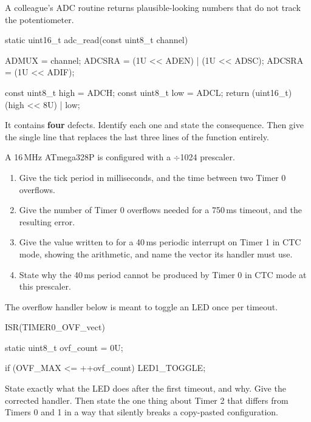 \label{exa:q:4}

 A colleague's ADC routine returns plausible-looking numbers that do not track the
potentiometer.

\begin{ccode}
static uint16_t adc_read(const uint8_t channel)
{
    ADMUX  = channel;
    ADCSRA = (1U << ADEN) | (1U << ADSC);
    ADCSRA = (1U << ADIF);

    const uint8_t high = ADCH;
    const uint8_t low  = ADCL;
    return (uint16_t)(high << 8U) | low;
}
\end{ccode}

\noindent It contains \textbf{four} defects. Identify each one and state the consequence. Then give
the single line that replaces the last three lines of the function entirely. 

 A 16\,MHz ATmega328P is configured with a $\div$1024 prescaler.
\begin{enumerate}
  \item Give the tick period in milliseconds, and the time between two Timer 0 overflows.
  \item Give the number of Timer 0 overflows needed for a 750\,ms timeout, and the resulting error.
  \item Give the value written to  for a 40\,ms periodic interrupt on Timer 1 in CTC
    mode, showing the arithmetic, and name the vector its handler must use.
  \item State why the 40\,ms period cannot be produced by Timer 0 in CTC mode at this prescaler.
\end{enumerate}

 The overflow handler below is meant to toggle an LED once per timeout.

\begin{ccode}
ISR(TIMER0_OVF_vect)
{
    static uint8_t ovf_count = 0U;

    if (OVF_MAX <= ++ovf_count) { LED1_TOGGLE; }
}
\end{ccode}

\noindent State exactly what the LED does after the first timeout, and why. Give the corrected
handler. Then state the one thing about Timer 2 that differs from Timers 0 and 1 in a way that
silently breaks a copy-pasted configuration. 

\label{exa:q:5}

